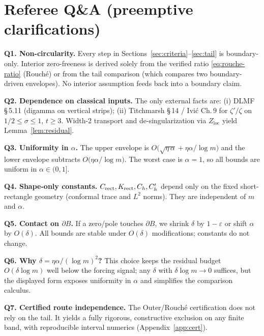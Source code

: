 \documentclass[11pt]{article}
\numberwithin{equation}{section}
\theoremstyle{remark}
\newcommand{\Zloc}{Z_{\mathrm{loc}}}
\begin{document}
\section{Referee Q\&A (preemptive clarifications)}\label{app:qa}
\textbf{Q1. Non-circularity.} Every step in Sections~\ref{sec:criteria}--\ref{sec:tail} is boundary-only. Interior zero-freeness is derived solely from the verified ratio \eqref{eq:rouche-ratio} (Rouch\'e) or from the tail comparison (which compares two boundary-driven envelopes). No interior assumption feeds back into a boundary claim.

\noindent\textbf{Q2. Dependence on classical inputs.} The only external facts are: (i) DLMF §\,5.11 (digamma on vertical strips); (ii) Titchmarsh §\,14 / Ivi\'c Ch.\,9 for $\zeta'/\zeta$ on $1/2\le\sigma\le 1$, $t\ge 3$. Width-2 transport and de-singularization via $\Zloc$ yield Lemma~\ref{lem:residual}.

\noindent\textbf{Q3. Uniformity in $\alpha$.} The upper envelope is $O\!\big(\sqrt{\eta\,\alpha}+\eta\alpha/\log m\big)$ and the lower envelope subtracts $O\!\big(\eta\alpha/\log m\big)$. The worst case is $\alpha=1$, so all bounds are uniform in $\alpha\in(0,1]$.

\noindent\textbf{Q4. Shape-only constants.} $C_{\rm rect},K_{\rm rect},C_h,C_h'$ depend only on the fixed short-rectangle geometry (conformal trace and $L^2$ norms). They are independent of $m$ and $\alpha$.

\noindent\textbf{Q5. Contact on $\partial B$.} If a zero/pole touches $\partial B$, we shrink $\delta$ by $1-\varepsilon$ or shift $\alpha$ by $O(\delta)$. All bounds are stable under $O(\delta)$ modifications; constants do not change.

\noindent\textbf{Q6. Why $\delta=\eta\alpha/(\log m)^2$?} This choice keeps the residual budget $O(\delta\log m)$ well below the forcing signal; any $\delta$ with $\delta\log m\to 0$ suffices, but the displayed form exposes uniformity in $\alpha$ and simplifies the comparison calculus.

\noindent\textbf{Q7. Certified route independence.} The Outer/Rouch\'e certification does not rely on the tail. It yields a fully rigorous, constructive exclusion on any finite band, with reproducible interval numerics (Appendix~\ref{app:cert}).

\end{document}
